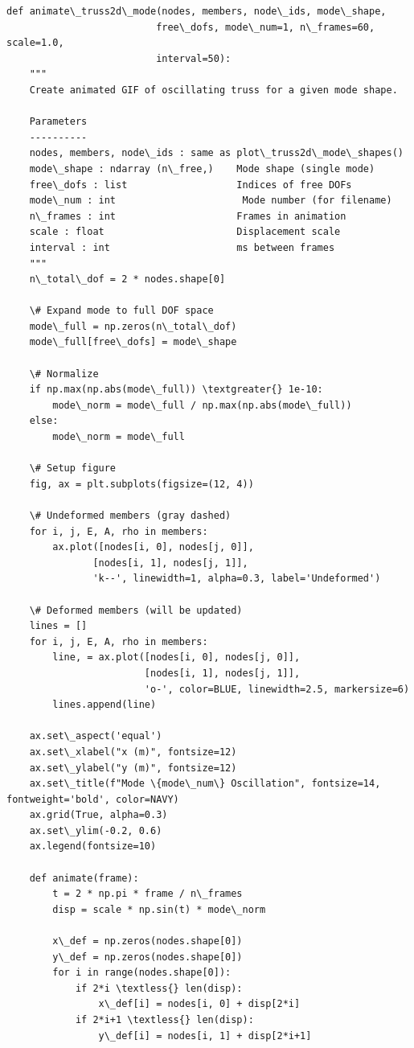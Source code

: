 \documentclass[12pt, a4paper]{article}
\begin{document}
\begin{lstlisting}[style=codestyle, caption={{visualize_truss2d.py --- 2D Warren Truss Visualizations}}]
def animate\_truss2d\_mode(nodes, members, node\_ids, mode\_shape,
                          free\_dofs, mode\_num=1, n\_frames=60, scale=1.0,
                          interval=50):
    """
    Create animated GIF of oscillating truss for a given mode shape.

    Parameters
    ----------
    nodes, members, node\_ids : same as plot\_truss2d\_mode\_shapes()
    mode\_shape : ndarray (n\_free,)    Mode shape (single mode)
    free\_dofs : list                   Indices of free DOFs
    mode\_num : int                      Mode number (for filename)
    n\_frames : int                     Frames in animation
    scale : float                       Displacement scale
    interval : int                      ms between frames
    """
    n\_total\_dof = 2 * nodes.shape[0]

    \# Expand mode to full DOF space
    mode\_full = np.zeros(n\_total\_dof)
    mode\_full[free\_dofs] = mode\_shape

    \# Normalize
    if np.max(np.abs(mode\_full)) \textgreater{} 1e-10:
        mode\_norm = mode\_full / np.max(np.abs(mode\_full))
    else:
        mode\_norm = mode\_full

    \# Setup figure
    fig, ax = plt.subplots(figsize=(12, 4))

    \# Undeformed members (gray dashed)
    for i, j, E, A, rho in members:
        ax.plot([nodes[i, 0], nodes[j, 0]],
               [nodes[i, 1], nodes[j, 1]],
               'k--', linewidth=1, alpha=0.3, label='Undeformed')

    \# Deformed members (will be updated)
    lines = []
    for i, j, E, A, rho in members:
        line, = ax.plot([nodes[i, 0], nodes[j, 0]],
                        [nodes[i, 1], nodes[j, 1]],
                        'o-', color=BLUE, linewidth=2.5, markersize=6)
        lines.append(line)

    ax.set\_aspect('equal')
    ax.set\_xlabel("x (m)", fontsize=12)
    ax.set\_ylabel("y (m)", fontsize=12)
    ax.set\_title(f"Mode \{mode\_num\} Oscillation", fontsize=14, fontweight='bold', color=NAVY)
    ax.grid(True, alpha=0.3)
    ax.set\_ylim(-0.2, 0.6)
    ax.legend(fontsize=10)

    def animate(frame):
        t = 2 * np.pi * frame / n\_frames
        disp = scale * np.sin(t) * mode\_norm

        x\_def = np.zeros(nodes.shape[0])
        y\_def = np.zeros(nodes.shape[0])
        for i in range(nodes.shape[0]):
            if 2*i \textless{} len(disp):
                x\_def[i] = nodes[i, 0] + disp[2*i]
            if 2*i+1 \textless{} len(disp):
                y\_def[i] = nodes[i, 1] + disp[2*i+1]


\end{lstlisting}
\end{document}
